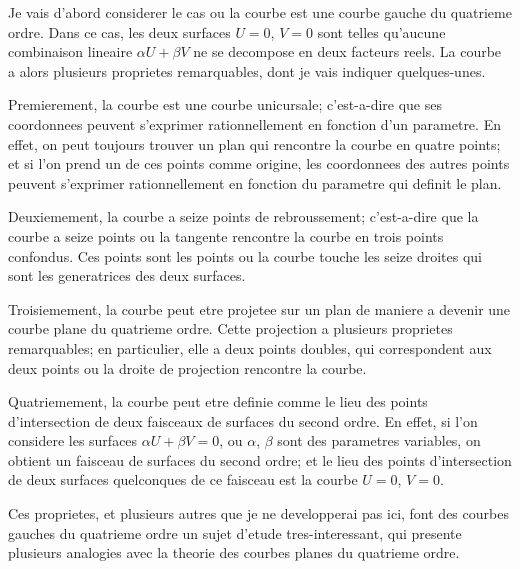 \documentclass[11pt,a4paper]{article}
\begin{document}
Je vais d'abord considerer le cas ou la courbe est une courbe gauche du quatrieme
ordre. Dans ce cas, les deux surfaces $U = 0$, $V = 0$ sont telles qu'aucune combinaison
lineaire $\alpha U + \beta V$ ne se decompose en deux facteurs reels. La courbe a alors plusieurs
proprietes remarquables, dont je vais indiquer quelques-unes.

Premierement, la courbe est une courbe unicursale; c'est-a-dire que ses coordonnees
peuvent s'exprimer rationnellement en fonction d'un parametre. En effet, on peut
toujours trouver un plan qui rencontre la courbe en quatre points; et si l'on prend
un de ces points comme origine, les coordonnees des autres points peuvent s'exprimer
rationnellement en fonction du parametre qui definit le plan.

Deuxiemement, la courbe a seize points de rebroussement; c'est-a-dire que la
courbe a seize points ou la tangente rencontre la courbe en trois points confondus.
Ces points sont les points ou la courbe touche les seize droites qui sont les generatrices
des deux surfaces.

Troisiemement, la courbe peut etre projetee sur un plan de maniere a devenir une
courbe plane du quatrieme ordre. Cette projection a plusieurs proprietes remarquables;
en particulier, elle a deux points doubles, qui correspondent aux deux points ou la droite
de projection rencontre la courbe.

Quatriemement, la courbe peut etre definie comme le lieu des points d'intersection
de deux faisceaux de surfaces du second ordre. En effet, si l'on considere les surfaces
$\alpha U + \beta V = 0$, ou $\alpha$, $\beta$ sont des parametres variables, on obtient un faisceau de
surfaces du second ordre; et le lieu des points d'intersection de deux surfaces quelconques
de ce faisceau est la courbe $U = 0$, $V = 0$.

Ces proprietes, et plusieurs autres que je ne developperai pas ici, font des courbes
gauches du quatrieme ordre un sujet d'etude tres-interessant, qui presente plusieurs
analogies avec la theorie des courbes planes du quatrieme ordre.
\end{document}
